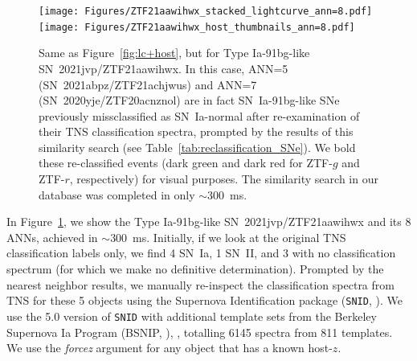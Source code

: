 \documentclass[twocolumn]{aastex63}
\begin{document}
\begin{figure}
    \centering
    \texttt{[image: Figures/ZTF21aawihwx\_stacked\_lightcurve\_ann=8.pdf]}
    \texttt{[image: Figures/ZTF21aawihwx\_host\_thumbnails\_ann=8.pdf]}
    \caption{
    Same as Figure~\ref{fig:lc+host}, but for Type Ia-91bg-like SN~2021jvp/ZTF21aawihwx. In this case, ANN=5 (SN~2021abpz/ZTF21achjwus) and ANN=7 (SN~2020yje/ZTF20acnznol) are in fact SN~Ia-91bg-like SNe previously missclassified as SN~Ia-normal after re-examination of their TNS classification spectra, prompted by the results of this similarity search (see Table~\ref{tab:reclassification_SNe}). We bold these re-classified events (dark green and dark red for ZTF-$g$ and ZTF-$r$, respectively) for visual purposes. The similarity search in our database was completed in only $\sim$300~ms.
    } 
    \label{fig:lc_missed91bg}
\end{figure}

In Figure~\ref{fig:lc_missed91bg}, we show the Type Ia-91bg-like SN~2021jvp/ZTF21aawihwx and its 8 ANNs, achieved in $\sim$300~ms. Initially, if we look at the original TNS classification labels only, we find 4 SN~Ia, 1 SN~II, and 3 with no classification spectrum (for which we make no definitive determination). Prompted by the nearest neighbor results, we manually re-inspect the classification spectra from TNS for these 5 objects using the Supernova Identification package (\texttt{SNID}, \citealt{Blondin2007}). We use the 5.0 version of \texttt{SNID} with additional template sets from the Berkeley Supernova Ia Program (BSNIP, \citealt{Silverman2012}), \cite{Modjaz2014, Liu2014, Liu2016, Modjaz2016, Gutirrez2017, Williamson2019}, totalling 6145 spectra from 811 templates. We use the \textit{forcez} argument for any object that has a known host-$z$. \par
\end{document}
